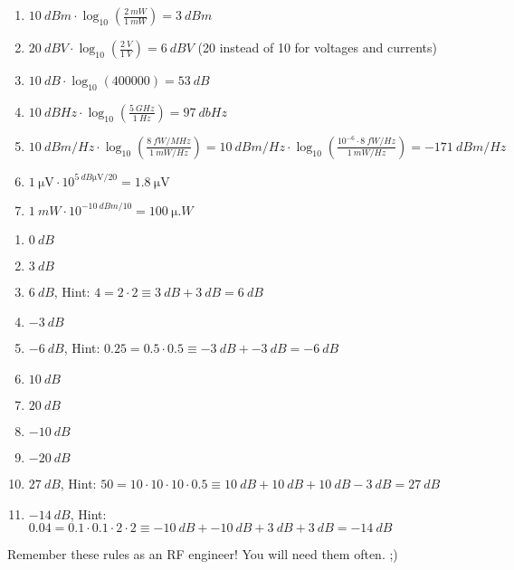 \begin{solution}
	\begin{tasks}
		\task
		\begin{enumerate}
			\item $\SI{10}{dBm} \cdot \log_{10} \left(\frac{\SI{2}{mW}}{\SI{1}{mW}}\right) = \SI{3}{dBm}$
			\item $\SI{20}{dBV} \cdot \log_{10} \left(\frac{\SI{2}{V}}{\SI{1}{V}}\right) = \SI{6}{dBV}$ (20 instead of 10 for voltages and currents)
			\item $\SI{10}{dB} \cdot \log_{10} \left(400000\right) = \SI{53}{dB}$
			\item $\SI{10}{dBHz} \cdot \log_{10} \left(\frac{\SI{5}{GHz}}{\SI{1}{Hz}}\right) = \SI{97}{dbHz}$
			\item $\SI{10}{dBm/Hz} \cdot \log_{10} \left(\frac{\SI{8}{fW/MHz}}{\SI{1}{mW/Hz}}\right) = \SI{10}{dBm/Hz} \cdot \log_{10} \left(\frac{10^{-6} \cdot \SI{8}{fW/Hz}}{\SI{1}{mW/Hz}}\right) = \SI{-171}{dBm/Hz}$
			\item $\SI{1}{\micro\volt} \cdot 10^{\SI{5}{dB\micro\volt} / 20} = \SI{1.8}{\micro\volt}$
			\item $\SI{1}{mW} \cdot 10^{\SI{-10}{dBm} / 10} = \SI{100}{\micro.W}$
		\end{enumerate}
	
		\task
		\begin{enumerate}
			\item $\SI{0}{dB}$
			\item $\SI{3}{dB}$
			\item $\SI{6}{dB}$, Hint: $4 = 2 \cdot 2 \equiv \SI{3}{dB} + \SI{3}{dB} = \SI{6}{dB}$
			\item $\SI{-3}{dB}$
			\item $\SI{-6}{dB}$, Hint: $0.25 = 0.5 \cdot 0.5 \equiv \SI{-3}{dB} + \SI{-3}{dB} = \SI{-6}{dB}$
			\item $\SI{10}{dB}$
			\item $\SI{20}{dB}$
			\item $\SI{-10}{dB}$
			\item $\SI{-20}{dB}$
			\item $\SI{27}{dB}$, Hint: $50 = 10 \cdot 10 \cdot 10 \cdot 0.5 \equiv \SI{10}{dB} + \SI{10}{dB} + \SI{10}{dB} - \SI{3}{dB} = \SI{27}{dB}$
			\item $\SI{-14}{dB}$, Hint: $0.04 = 0.1 \cdot 0.1 \cdot 2 \cdot 2 \equiv \SI{-10}{dB} + \SI{-10}{dB} + \SI{3}{dB} + \SI{3}{dB} = \SI{-14}{dB}$
		\end{enumerate}
		Remember these rules as an RF engineer! You will need them often. ;)
		

\end{tasks}
\end{solution}
